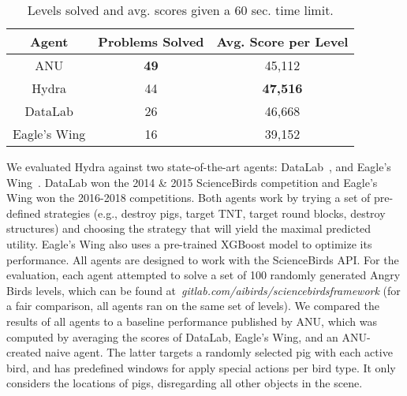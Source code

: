 \documentclass[letterpaper]{article}
\begin{document}
\begin{table}
\centering
\small
\begin{adjustbox}{width=0.68\columnwidth}
\begin{tabular}{|c|c|c|}
\hline
\textbf{Agent} & \textbf{Problems Solved} & \textbf{Avg. Score per Level} \\ \hline
ANU    & \textbf{49}              & 45,112                      \\ \hline
Hydra          & 44                       & \textbf{47,516}             \\ \hline
DataLab        & 26                       & 46,668                      \\ \hline
Eagle's  Wing  & 16                       & 39,152                      \\ \hline
\end{tabular}
\end{adjustbox}
\vspace{-0.72mm}
\caption{Levels solved and avg. scores given a 60 sec. time limit.}
\label{tab:results}
\end{table}



We evaluated Hydra against two state-of-the-art agents:
DataLab~\cite{borovicka2014datalab}, and
Eagle's Wing~\cite{wang2017description}.
DataLab won the 2014 \& 2015 ScienceBirds competition and Eagle's Wing won the 2016-2018 competitions.
Both agents work by trying a set of pre-defined strategies (e.g., destroy pigs, target TNT, target round blocks, destroy structures) and choosing the strategy that will yield the maximal predicted utility.
Eagle's Wing also uses a pre-trained XGBoost model to optimize its performance. %
All agents are designed to work with the ScienceBirds API. For the evaluation, each agent attempted to solve a set of 100 randomly generated Angry Birds levels, which can be found at~\emph{gitlab.com/aibirds/sciencebirdsframework} (for a fair comparison, all agents ran on the same set of levels).
We compared the results of all agents to a baseline performance published by ANU, which was computed by averaging the scores of
DataLab,
Eagle's Wing,
and an ANU-created naive agent.
The latter targets a randomly selected pig with each active bird, and has predefined windows for apply special actions per bird type. It only considers the locations of pigs, disregarding all other objects in the scene.
\end{document}
